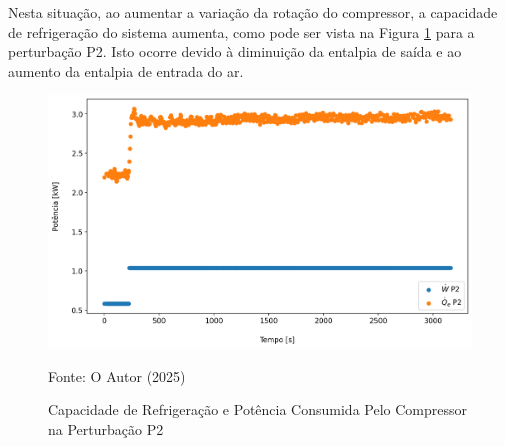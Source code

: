 Nesta situação, ao aumentar a variação da rotação do compressor, a capacidade de refrigeração do sistema aumenta, como pode ser vista na Figura \ref{fig:Capacidade de Resfriamento e potência consumida pelo Compressor P2} para a perturbação P2. Isto ocorre devido à diminuição da entalpia de saída e ao aumento da entalpia de entrada do ar.
\newpage
\begin{figure}[h]
    \centering
    \includegraphics[width=1\linewidth]{FigurasdoTexto/Qe e W Perturbação Rot.png}
    \caption{Capacidade de Refrigeração e Potência Consumida Pelo Compressor na Perturbação P2}
    \label{fig:Capacidade de Resfriamento e potência consumida pelo Compressor P2}
    {\footnotesize Fonte: O Autor (2025)}
\end{figure}

